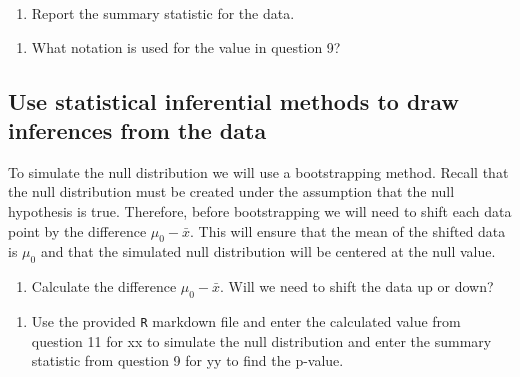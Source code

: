 \documentclass[
]{report}
\providecommand{\tightlist}{%
  \setlength{\itemsep}{0pt}\setlength{\parskip}{0pt}}
\begin{document}
\begin{enumerate}
\def\labelenumi{\arabic{enumi}.}
\setcounter{enumi}{8}
\tightlist
\item
  Report the summary statistic for the data.
\end{enumerate}

\vspace{0.3in}

\begin{enumerate}
\def\labelenumi{\arabic{enumi}.}
\setcounter{enumi}{9}
\tightlist
\item
  What notation is used for the value in question 9?
\end{enumerate}

\vspace{0.3in}

\hypertarget{use-statistical-inferential-methods-to-draw-inferences-from-the-data}{%
\subsection*{Use statistical inferential methods to draw inferences from the data}\label{use-statistical-inferential-methods-to-draw-inferences-from-the-data}}

To simulate the null distribution we will use a bootstrapping method. Recall that the null distribution must be created under the assumption that the null hypothesis is true. Therefore, before bootstrapping we will need to shift each data point by the difference \(\mu_0 - \bar{x}\). This will ensure that the mean of the shifted data is \(\mu_0\) and that the simulated null distribution will be centered at the null value.

\begin{enumerate}
\def\labelenumi{\arabic{enumi}.}
\setcounter{enumi}{10}
\tightlist
\item
  Calculate the difference \(\mu_0 - \bar{x}\). Will we need to shift the data up or down?
\end{enumerate}

\vspace{.7in}

\begin{enumerate}
\def\labelenumi{\arabic{enumi}.}
\setcounter{enumi}{11}
\tightlist
\item
  Use the provided \texttt{R} markdown file and enter the calculated value from question 11 for xx to simulate the null distribution and enter the summary statistic from question 9 for yy to find the p-value.
\end{enumerate}
\end{document}
